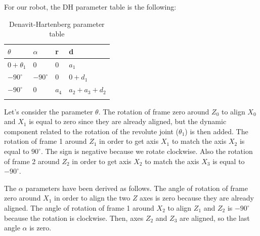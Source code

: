 \newpage
For our robot, the DH parameter table is the following:


\begin{longtable}{|p{3cm}|p{3cm}|p{3cm}|p{3cm}|}
	\hline 
	\textbf{$\theta$}&\textbf{$\alpha$}&\textbf{r}&\textbf{d}\\ 
	\hline 
	$0+ \theta_1$&0&0&$a_1$\\ 
	\hline
    $-90^{\circ}$&$-90^{\circ}$&0&$0 + d_1$\\
	\hline
	$-90^{\circ}$&0&$a_4$&$a_2+a_3+d_2$\\
	\hline
	\caption{Denavit-Hartenberg parameter table}
    \label{table:DHtable}
\end{longtable} 


Let's consider the parameter $\theta$. The rotation of frame zero around $Z_0$ to align $X_0$ and $X_1$ is equal to zero since they are already aligned, but the dynamic component related to the rotation of the revolute joint ($\theta_1$) is then added. The rotation of frame 1 around $Z_1$ in order to get axis $X_1$ to match the axis $X_2$ is equal to $90^{\circ}$. The sign is negative because we rotate clockwise. Also the rotation of frame 2 around $Z_2$ in order to get axis $X_2$ to match the axis $X_3$ is equal to $-90^{\circ}$.

The $\alpha$ parameters have been derived as follows. The angle of rotation of frame zero around $X_1$ in order to align the two $Z$ axes is zero because they are already aligned. The angle of rotation of frame 1 around $X_2$ to align $Z_1$ and $Z_2$ is $-90^{\circ}$ because the rotation is clockwise. Then, axes $Z_2$ and $Z_3$ are aligned, so the last angle $\alpha$ is zero.


